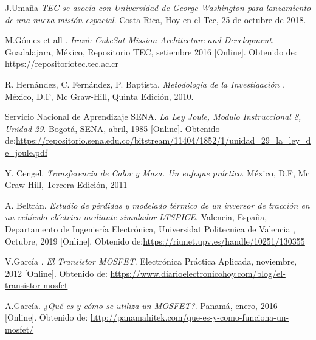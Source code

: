 \documentclass[notitlepage,oneside]{book}
\begin{document}









%
%
%
%
%
%
%
%

\begin{thebibliography}{99}
J.Umaña \emph{TEC se asocia con Universidad de George Washington para lanzamiento de una nueva misión espacial}. Costa Rica, Hoy en el Tec, 25 de octubre de 2018.

M.Gómez et all . \emph {Irazú: CubeSat Mission Architecture and Development}. Guadalajara, México, Repositorio TEC, setiembre 2016 [Online]. Obtenido de: \url{https://repositoriotec.tec.ac.cr}

R. Hernández, C. Fernández, P. Baptista. \emph {Metodología de la Investigación }. México, D.F, Mc Graw-Hill, Quinta Edición, 2010.

Servicio Nacional de Aprendizaje SENA. \emph {La Ley Joule, Modulo Instruccional 8, Unidad 29}. Bogotá, SENA, abril, 1985 [Online]. Obtenido de:\url{https://repositorio.sena.edu.co/bitstream/11404/1852/1/unidad_29_la_ley_de_joule.pdf}

Y. Cengel. \emph {Transferencia de Calor y Masa. Un enfoque práctico}. México, D.F, Mc Graw-Hill, Tercera Edición, 2011

A. Beltrán. \emph {Estudio de pérdidas y modelado térmico de un inversor de tracción en un vehículo eléctrico mediante simulador LTSPICE}. Valencia, España, Departamento de Ingeniería Electrónica, Universidat  Politecnica de Valencia , Octubre, 2019 [Online]. Obtenido de:\url{https://riunet.upv.es/handle/10251/130355} %

V.García . \emph {El Transistor MOSFET}. Electrónica Práctica Aplicada, noviembre, 2012 [Online]. Obtenido de: \url{https://www.diarioelectronicohoy.com/blog/el-transistor-mosfet}

A.García. \emph {¿Qué es y cómo se utiliza un MOSFET?}. Panamá, enero, 2016 [Online]. Obtenido de: \url{http://panamahitek.com/que-es-y-como-funciona-un-mosfet/}


\end{thebibliography}
\end{document}

